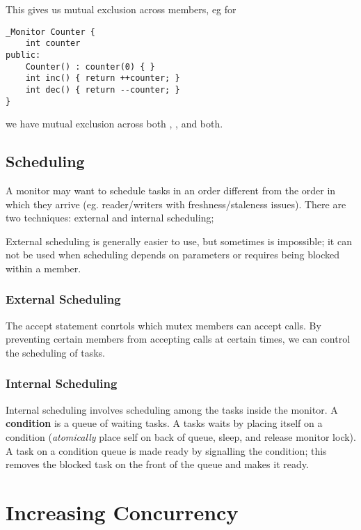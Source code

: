 \documentclass[12pt]{article}
\begin{document}
This gives us mutual exclusion across members, eg for
\begin{verbatim}
_Monitor Counter {
    int counter
public:
    Counter() : counter(0) { }
    int inc() { return ++counter; }
    int dec() { return --counter; }
}
\end{verbatim}
we have mutual exclusion across both , , and both.

\subsection{Scheduling}
A monitor may want to schedule tasks in an order different from the order in which they arrive (eg. reader/writers with freshness/staleness issues). There are two techniques: external and internal scheduling;

External scheduling is generally easier to use, but sometimes is impossible; it can not be used when scheduling depends on parameters or requires being blocked within a member.

\subsubsection{External Scheduling}
The accept statement conrtols which mutex members can accept calls. By preventing certain members from accepting calls at certain times, we can control the scheduling of tasks.

\subsubsection{Internal Scheduling}
Internal scheduling involves scheduling among the tasks inside the monitor. A {\bf condition} is a queue of waiting tasks. A tasks waits by placing itself on a condition (\textit{atomically} place self on back of queue, sleep, and release monitor lock). A task on a condition queue is made ready by signalling the condition; this removes the blocked task on the front of the queue and makes it ready.

\section{Increasing Concurrency}
\end{document}
